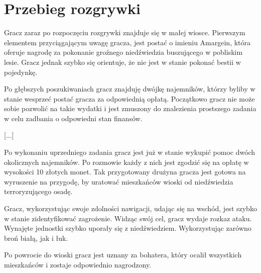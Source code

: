 \section{Przebieg rozgrywki}
Gracz zaraz po rozpoczęciu rozgrywki znajduje się w małej wiosce. Pierwszym
elementem przyciągającym uwagę gracza, jest postać o imieniu Amargein, która oferuje
nagrodę za pokonanie groźnego niedźwiedzia buszującego w pobliskim lesie. Gracz jednak
szybko się orientuje, że nie jest w stanie pokonać bestii w pojedynkę.

Po głębszych poszukiwaniach gracz znajduję dwójkę najemników, którzy byliby w stanie
wesprzeć postać gracza za odpowiednią opłatą. Początkowo gracz nie może sobie
pozwolić na takie wydatki i jest zmuszony do znalezienia prostszego zadania
w celu zadbania o odpowiedni stan finansów.

[...]

Po wykonaniu uprzedniego zadania gracz jest już w stanie wykupić pomoc dwóch okolicznych
najemników. Po rozmowie każdy z nich jest zgodzić się na opłatę w wysokości 10 złotych monet.
Tak przygotowany drużyna gracza jest gotowa na wyruszenie na przygodę, by uratować
mieszkańców wioski od niedźwiedzia terroryzującego osadę.

Gracz, wykorzystując swoje zdolności nawigacji, udając się na wschód, jest szybko w stanie zidentyfikować zagrożenie.
Widząc swój cel, gracz wydaje rozkaz ataku. Wynajęte jednostki szybko uporały się z niedźwiedziem. Wykorzystując zarówno
broń białą, jak i łuk.

Po powrocie do wioski gracz jest uznany za bohatera, który ocalił wszystkich mieszkańców i zostaje odpowiednio nagrodzony.

